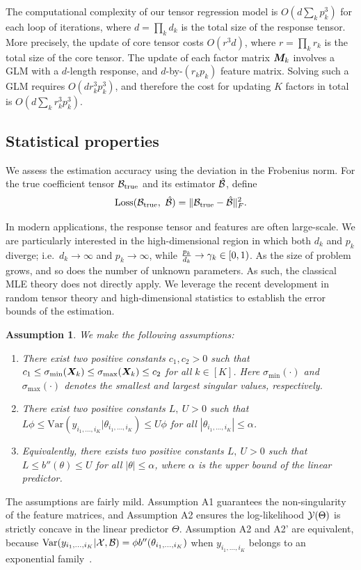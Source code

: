 \documentclass[12pt]{article}
\theoremstyle{plain}
\newtheorem{assumption}{Assumption}
\theoremstyle{definition}
\begin{document}
The computational complexity of our tensor regression model is $O\left(d \sum_k p^3_k\right)$ for each loop of iterations, where $d=\prod_k d_k$ is the total size of the response tensor. More precisely, the update of core tensor costs $O(r^3d)$, where $r=\prod_k r_k$ is the total size of the core tensor. The update of each factor matrix $\bm M_k$ involves a GLM with a $d$-length response, and $d$-by-$(r_kp_k)$ feature matrix. Solving such a GLM requires $O(dr^3_kp^3_k)$, and therefore the cost for updating $K$ factors in total is $O( d\sum_k r^3_k p_k^3)$.



\subsection{Statistical properties}\label{subsec:statprob}
We assess the estimation accuracy using the deviation in the Frobenius norm. For the true coefficient tensor $\mathcal{B}_{\text{true}}$ and its estimator $\hat {\mathcal{B}}$, define
\[
\text{Loss}(\mathcal{B}_{\text{true}},\ \hat {\mathcal{B}})=\lVert\mathcal{B}_{\text{true}}- \hat {\mathcal{B}}\rVert_F^2.
\]

In modern applications, the response tensor and features are often large-scale. We are particularly interested in the high-dimensional region in which both $d_k$ and $p_k$ diverge; i.e.\ $d_k\to \infty$ and $p_k\to\infty$, while ${p_k\over d_k} \to \gamma_k \in[0,1)$. As the size of problem grows, and so does the number of unknown parameters. As such, the classical MLE theory does not directly apply. We leverage the recent development in random tensor theory and high-dimensional statistics to establish the error bounds of the estimation. 

  
  
\begin{assumption}\label{ass}We make the following assumptions:
\begin{enumerate}
\item [A1.] There exist two positive constants $c_1, c_2>0$ such that $c_1\leq \sigma_{\min}(\bm X_k)\leq  \sigma_{\max}(\bm X_k)\leq c_2$ for all $k\in[K]$. Here $\sigma_{\text{min}}(\cdot)$ and $\sigma_{\text{max}}(\cdot)$ denotes the smallest and largest singular values, respectively.
\item [A2.] There exist two positive constants $L,\ U>0$ such that $L\phi \leq \text{Var}(y_{i_1,\ldots,i_K}|\theta_{i_1,\ldots,i_K})\leq U\phi $ for all $|\theta_{i_1,\ldots,i_K}|\leq \alpha$.
\item[A2'.] Equivalently, there exists two positive constants $L,\ U>0$ such that $L\leq b''(\theta) \leq U$ for all $|\theta|\leq \alpha$, where $\alpha$ is the upper bound of the linear predictor. 

\end{enumerate}
\end{assumption}
The assumptions are fairly mild. Assumption A1 guarantees the non-singularity of the feature matrices, and Assumption A2 ensures the log-likelihood $\mathcal{Y}(\Theta)$ is strictly concave in the linear predictor $\Theta$. Assumption A2 and A2' are equivalent, because $\text{Var}(y_{i_1,\ldots,i_K}|\mathcal{X},\mathcal{B})=\phi b''(\theta_{i_1,\ldots,i_K})$ when $y_{i_1,\ldots,i_K}$ belongs to an exponential family~\citep{mccullagh1989generalized}. 
\end{document}
